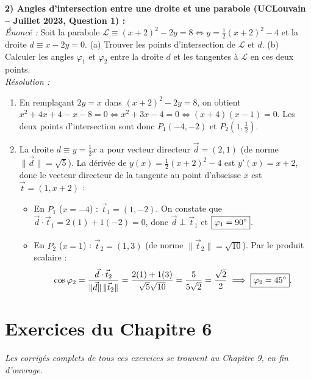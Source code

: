 \begin{exemple}
\medskip
\textbf{2) Angles d'intersection entre une droite et une parabole (UCLouvain -- Juillet 2023, Question 1) :}\\
\emph{Énoncé :} Soit la parabole $\mathcal{L} \equiv (x+2)^2 - 2y = 8 \iff y = \frac{1}{2}(x+2)^2 - 4$ et la droite $d \equiv x - 2y = 0$. (a) Trouver les points d'intersection de $\mathcal{L}$ et $d$. (b) Calculer les angles $\varphi_1$ et $\varphi_2$ entre la droite $d$ et les tangentes à $\mathcal{L}$ en ces deux points.\\
\emph{Résolution :}
\begin{enumerate}[label=(\alph*)]
    \item En remplaçant $2y = x$ dans $(x+2)^2 - 2y = 8$, on obtient $x^2 + 4x + 4 - x - 8 = 0 \iff x^2 + 3x - 4 = 0 \iff (x+4)(x-1) = 0$. Les deux points d'intersection sont donc $\boxed{P_1(-4, -2) \text{ et } P_2\left(1, \frac{1}{2}\right)}$.
    \item La droite $d \equiv y = \frac{1}{2}x$ a pour vecteur directeur $\vec{d} = (2, 1)$ (de norme $\|\vec{d}\| = \sqrt{5}$). La dérivée de $y(x) = \frac{1}{2}(x+2)^2 - 4$ est $y'(x) = x + 2$, donc le vecteur directeur de la tangente au point d'abscisse $x$ est $\vec{t} = (1, x+2)$ :
    \begin{itemize}
        \item En $P_1$ ($x = -4$) : $\vec{t}_1 = (1, -2)$. On constate que $\vec{d} \cdot \vec{t}_1 = 2(1) + 1(-2) = 0$, donc $\vec{d} \perp \vec{t}_1$ et $\boxed{\varphi_1 = 90\degree}$.
        \item En $P_2$ ($x = 1$) : $\vec{t}_2 = (1, 3)$ (de norme $\|\vec{t}_2\| = \sqrt{10}$). Par le produit scalaire :
        \[
            \cos\varphi_2 = \frac{\vec{d} \cdot \vec{t}_2}{\|\vec{d}\|\,\|\vec{t}_2\|} = \frac{2(1) + 1(3)}{\sqrt{5}\sqrt{10}} = \frac{5}{5\sqrt{2}} = \frac{\sqrt{2}}{2} \implies \boxed{\varphi_2 = 45\degree}.
        \]
    \end{itemize}
\end{enumerate}
\end{exemple}

\section{Exercices du Chapitre 6}

\emph{Les corrigés complets de tous ces exercices se trouvent au Chapitre 9, en fin d'ouvrage.}

